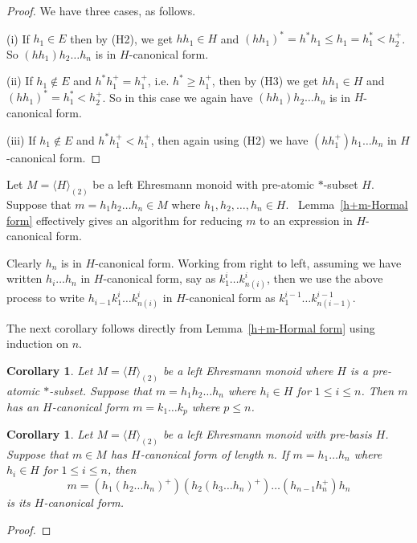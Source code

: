 \documentclass[12pt]{amsart}
\newtheorem{cor}[them]{Corollary}
\theoremstyle{definition}
\theoremstyle{definition}
\numberwithin{them}{section}
\numberwithin{equation}{section}
\begin{document}
{{\begin{proof} We have three cases, as follows.

(i) If $h_1\in E$ then by  (H2), we get $hh_1 \in H$ and $(hh_1)^*=h^*h_1\leq h_1=h_1^* < h_2^+$. So $(hh_1)h_2\dots h_n$ is in $H$-canonical form.


 (ii) If  $h_1\notin E $ and $h^*h_1^+ = h_1^+$, i.e. $ h^*\geq h_1^+ $,  then by (H3) we get  $hh_1 \in H$  and $(hh_1)^*=h_1^* < h_2^+$. So  in this case we again have $(hh_1)h_2\dots h_n$ is in $H$-canonical form.
 
 (iii) If $h_1\notin E$ and $h^*h_1^+ < h_1^+$,  then again using (H2) we have $(hh_1^+)h_1\dots h_n$ in $H$-canonical form.
\end{proof}


Let $M=\langle H\rangle_{(2)}$ be a left Ehresmann monoid with pre-atomic $*$-subset $H$.  Suppose that  $m = h_1h_2\dots h_n \in M$ where $h_1, h_2, \dots, h_n \in H$. \, Lemma~\ref{h+m-Hormal form} effectively gives  an algorithm for reducing $m$ to an expression in $H$-canonical form.

Clearly $h_n$ is in $H$-canonical form. Working from right to left, assuming we have written $h_i\dots h_n$ in $H$-canonical form, say as
$k^i_1\dots k^i_{n(i)}$, then we use the above process to write $h_{i-1}k^i_1\dots k^i_{n(i)}$ in $H$-canonical form as $k^{i-1}_1\dots k^{i-1}_{n(i-1)}$.

The next corollary follows directly from Lemma~\ref{h+m-Hormal form} 
 using induction on $n$.


\begin{cor}\label{cor:short}  
Let $M=\langle H\rangle_{(2)}$ be a left Ehresmann monoid where $H$ is a  pre-atomic $*$-subset. Suppose that  $m = h_1h_2\dots h_n$ where $h_i\in H$ for $1\leq i\leq n$. Then $m$ has an $H$-canonical form $m=k_1\dots k_p$ where $p\leq n$. 
\end{cor}


\begin{cor}\label{cor:short2}    
Let $M=\langle H\rangle_{(2)}$ be a left Ehresmann monoid with  pre-basis $H$. 
Suppose that  
$m\in M$  has $H$-canonical form  of length n. 
 If  $m=h_1\dots h_n$ where $h_i\in H$ for $1\leq i\leq n$,
 then 
\[m=(h_1(h_2\dots h_n)^+)(h_2(h_3\dots h_n)^+)\dots (h_{n-1}h_n^+)h_n\]
 is its $H$-canonical form. 
\end{cor}


\begin{proof} 


\end{proof}}}
\end{document}

